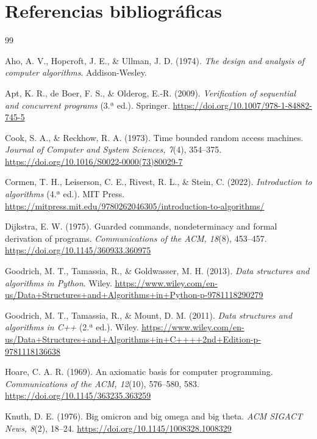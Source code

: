 \documentclass[12pt,letterpaper]{article}
\begin{document}
\clearpage
\section{Referencias bibliográficas}

\begin{thebibliography}{99}
\setlength{\itemsep}{0.65em}

Aho, A. V., Hopcroft, J. E., \& Ullman, J. D. (1974). \textit{The design and analysis of computer algorithms}. Addison-Wesley.

Apt, K. R., de Boer, F. S., \& Olderog, E.-R. (2009). \textit{Verification of sequential and concurrent programs} (3.ª ed.). Springer. \url{https://doi.org/10.1007/978-1-84882-745-5}

Cook, S. A., \& Reckhow, R. A. (1973). Time bounded random access machines. \textit{Journal of Computer and System Sciences, 7}(4), 354--375. \url{https://doi.org/10.1016/S0022-0000(73)80029-7}

Cormen, T. H., Leiserson, C. E., Rivest, R. L., \& Stein, C. (2022). \textit{Introduction to algorithms} (4.ª ed.). MIT Press. \url{https://mitpress.mit.edu/9780262046305/introduction-to-algorithms/}

Dijkstra, E. W. (1975). Guarded commands, nondeterminacy and formal derivation of programs. \textit{Communications of the ACM, 18}(8), 453--457. \url{https://doi.org/10.1145/360933.360975}

Goodrich, M. T., Tamassia, R., \& Goldwasser, M. H. (2013). \textit{Data structures and algorithms in Python}. Wiley. \url{https://www.wiley.com/en-us/Data+Structures+and+Algorithms+in+Python-p-9781118290279}

Goodrich, M. T., Tamassia, R., \& Mount, D. M. (2011). \textit{Data structures and algorithms in C++} (2.ª ed.). Wiley. \url{https://www.wiley.com/en-us/Data+Structures+and+Algorithms+in+C++++2nd+Edition-p-9781118136638}

Hoare, C. A. R. (1969). An axiomatic basis for computer programming. \textit{Communications of the ACM, 12}(10), 576--580, 583. \url{https://doi.org/10.1145/363235.363259}

Knuth, D. E. (1976). Big omicron and big omega and big theta. \textit{ACM SIGACT News, 8}(2), 18--24. \url{https://doi.org/10.1145/1008328.1008329}


\end{thebibliography}
\end{document}
